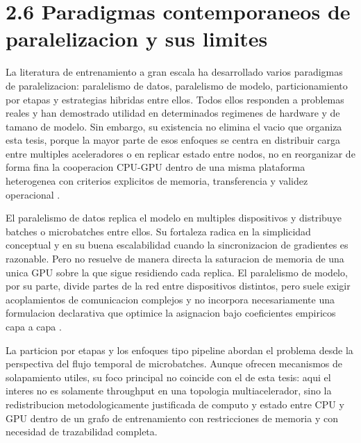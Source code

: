 \section{2.6 Paradigmas contemporaneos de paralelizacion y sus limites}
La literatura de entrenamiento a gran escala ha desarrollado varios paradigmas de paralelizacion: paralelismo de datos, paralelismo de modelo, particionamiento por etapas y estrategias hibridas entre ellos. Todos ellos responden a problemas reales y han demostrado utilidad en determinados regimenes de hardware y de tamano de modelo. Sin embargo, su existencia no elimina el vacio que organiza esta tesis, porque la mayor parte de esos enfoques se centra en distribuir carga entre multiples aceleradores o en replicar estado entre nodos, no en reorganizar de forma fina la cooperacion CPU-GPU dentro de una misma plataforma heterogenea con criterios explicitos de memoria, transferencia y validez operacional \cite{huang2019gpipe,narayanan2019pipedream,shoeybi2019megatron,zheng2022alpa}.

El paralelismo de datos replica el modelo en multiples dispositivos y distribuye batches o microbatches entre ellos. Su fortaleza radica en la simplicidad conceptual y en su buena escalabilidad cuando la sincronizacion de gradientes es razonable. Pero no resuelve de manera directa la saturacion de memoria de una unica GPU sobre la que sigue residiendo cada replica. El paralelismo de modelo, por su parte, divide partes de la red entre dispositivos distintos, pero suele exigir acoplamientos de comunicacion complejos y no incorpora necesariamente una formulacion declarativa que optimice la asignacion bajo coeficientes empiricos capa a capa \cite{huang2019gpipe,narayanan2019pipedream,shoeybi2019megatron}.

La particion por etapas y los enfoques tipo pipeline abordan el problema desde la perspectiva del flujo temporal de microbatches. Aunque ofrecen mecanismos de solapamiento utiles, su foco principal no coincide con el de esta tesis: aqui el interes no es solamente throughput en una topologia multiacelerador, sino la redistribucion metodologicamente justificada de computo y estado entre CPU y GPU dentro de un grafo de entrenamiento con restricciones de memoria y con necesidad de trazabilidad completa.

